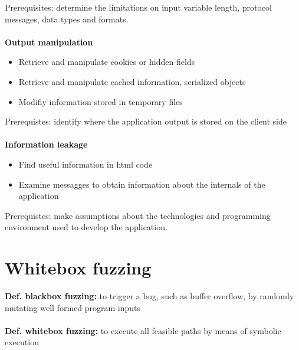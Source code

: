 \documentclass[10pt,a4paper]{article}
\begin{document}
Prerequisites: determine the limitations on input variable length, protocol messages, data types and formats.\\\\
\newpage
\textbf{Output manipulation}
\begin{itemize}
\item Retrieve and manipulate cookies or hidden fields
\item Retrieve and manipulate cached information, serialized objects
\item Modifiy information stored in temporary files
\end{itemize}
Prerequistes: identify where the application output is stored on the client side\\\\
\textbf{Information leakage}
\begin{itemize}
\item Find useful information in html code
\item Examine messagges to obtain information about the internals of the application
\end{itemize}
Prerequistes: make assumptions about the technologies and programming environment used to develop the application.
\newpage
\section{Whitebox fuzzing}
\textbf{Def. blackbox fuzzing:} to trigger a bug, such as buffer overflow, by randomly mutating well formed program inputs\\\\
\textbf{Def. whitebox fuzzing:} to execute all feasible paths by means of symbolic execution
\end{document}
